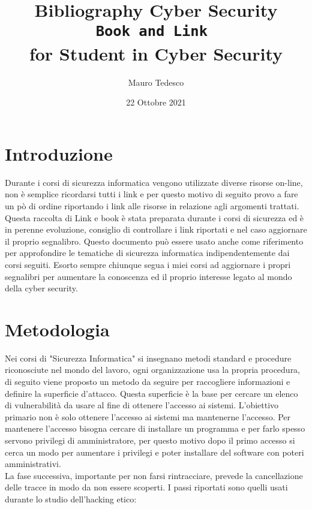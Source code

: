 \documentclass[a4paper,12pt]{article}
\title{Bibliography Cyber Security\\ \texttt{Book and Link } \\ for Student in Cyber Security}
\author{Mauro Tedesco }
\date{22 Ottobre 2021}
\begin{document}
\maketitle

\tableofcontents

\section{Introduzione}

Durante i corsi di sicurezza informatica vengono utilizzate diverse risorse on-line, non è semplice ricordarsi tutti i link e per questo motivo di seguito provo a fare un pò di ordine riportando i link alle risorse in relazione agli argomenti trattati.
Questa raccolta di Link e book è stata preparata durante i corsi di sicurezza ed è in perenne evoluzione, consiglio di controllare i link riportati e nel caso aggiornare il proprio segnalibro.
Questo documento può essere usato anche come riferimento per approfondire le tematiche di sicurezza informatica indipendentemente dai corsi seguiti. Esorto sempre chiunque segua i miei corsi ad aggiornare i propri segnalibri per aumentare la conoscenza ed il proprio interesse legato al mondo della cyber security.

\section{Metodologia}

Nei corsi di "Sicurezza Informatica" si insegnano metodi standard e procedure riconosciute nel mondo del lavoro, ogni organizzazione usa la propria procedura, di seguito viene proposto un metodo da seguire per  raccogliere informazioni e definire la superficie d'attacco.
Questa superficie è la base per cercare un elenco di vulnerabilità da usare al fine di ottenere l'accesso ai sistemi. 
L'obiettivo primario non è solo ottenere l'accesso ai sistemi ma mantenerne l'accesso.
Per mantenere l'accesso bisogna cercare di installare un programma e per farlo spesso servono privilegi di amministratore, per questo motivo dopo il primo accesso si cerca  un modo per
aumentare i privilegi e poter installare del software con poteri amministrativi.
\\ La fase successiva, importante per non farsi rintracciare, prevede la cancellazione delle tracce
in modo da non essere scoperti.
I passi riportati sono quelli usati durante lo studio dell'hacking etico:
\end{document}
